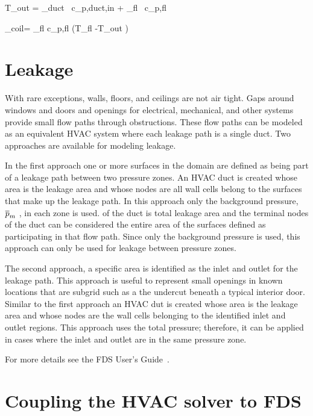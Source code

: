 \be T_{\rm out} = 
                             {_{\rm duct} \, c_{p,{\rm duct,in}} + _{\rm fl} \, c_{p,{\rm fl}} } \ee

\be {}_{\rm coil}= _{\rm fl} c_{p,{\rm fl}} \left(T_{\rm fl} -T_{\rm out} \right) \eta \ee

\section{Leakage}

With rare exceptions, walls, floors, and ceilings are not air tight.  Gaps around windows and doors and openings for electrical, mechanical, and other systems provide small flow paths through obstructions.  These flow paths can be modeled as an equivalent HVAC system where each leakage path is a single duct.  Two approaches are available for modeling leakage.

In the first approach one or more surfaces in the domain are defined as being part of a leakage path between two pressure zones. An HVAC duct is created whose area is the leakage area and whose nodes are all wall cells belong to the surfaces that make up the leakage path. In this approach only the background pressure, $\overline{p}_m$ , in each zone is used. of the duct is total leakage area and the terminal nodes of the duct can be considered the entire area of the surfaces defined as participating in that flow path. Since only the background pressure is used, this approach can only be used for leakage between pressure zones. 

The second approach, a specific area is identified as the inlet and outlet for the leakage path. This approach is useful to represent small openings in known locations that are subgrid such as a the undercut beneath a typical interior door. Similar to the first approach an HVAC dut is created whose area is the leakage area and whose nodes are the wall cells belonging to the identified inlet and outlet regions. This approach uses the total pressure; therefore, it can be applied in cases where the inlet and outlet are in the same pressure zone. 

For more details see the FDS User's Guide~\cite{FDS_Users_Guide}.

\newpage
\section{Coupling the HVAC solver to FDS}


